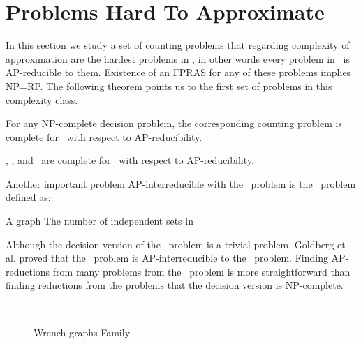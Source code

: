 \section{Problems Hard To Approximate} \label{sec:hard}
In this section we study a set of counting problems that regarding complexity
of approximation are the hardest problems in \cp, in other words every
problem in \cp\ is AP-reducible to them.
Existence of an FPRAS for any of these problems implies NP=RP\@. The following theorem 
points us to the first set of problems in this complexity class.

\begin{theorem} 
For any NP-complete decision problem, the corresponding counting problem is complete
for \cp\ with respect to AP-reducibility.
\end{theorem}

\begin{cor}
\csat, \ctsat, and \ctcol\ are complete for \cp\ with respect to AP-reducibility.
\end{cor}

Another important problem AP-interreducible with the \csat\ problem is the \cis\ problem defined as:

\pnndef%
{A graph \mG}
{The number of independent sets in \mG}

Although the decision version of the \cis\ problem is a trivial problem, Goldberg et al.
\cite{Leslie03} proved that the \cis\ problem is AP-interreducible to the \csat\ problem. 
Finding AP-reductions from many problems from the \cis\ problem is more straightforward than
finding reductions from the problems that the decision version is NP-complete.

\begin{figure}[h]
\centering 
\subfigure[\ensuremath{Wr_0}]{\label{fig:Wr0}}\hspace{4.78cm}
\subfigure[\ensuremath{Wr_1}]{\label{fig:Wr1}}\\
\subfigure[\ensuremath{Wr_2}]{\label{fig:Wr2}}\hspace{4cm}
\subfigure[\ensuremath{Wr_3}]{\label{fig:Wr3}}
\caption{Wrench graphs Family}
\label{fig:wrench}
\end{figure}

